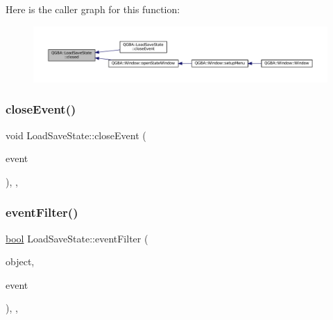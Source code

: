 Here is the caller graph for this function\+:
\nopagebreak
\begin{figure}[H]
\begin{center}
\leavevmode
\includegraphics[width=350pt]{class_q_g_b_a_1_1_load_save_state_a2f8bf8d005d4c4b37e1f510b069016b9_icgraph}
\end{center}
\end{figure}
\mbox{\label{class_q_g_b_a_1_1_load_save_state_a93708b5072f80412acfa87f61e06518c}} 
\subsubsection{\texorpdfstring{close\+Event()}{closeEvent()}}
{\footnotesize\ttfamily void Load\+Save\+State\+::close\+Event (\begin{DoxyParamCaption}\item[{Q\+Close\+Event $\ast$}]{event }\end{DoxyParamCaption})\hspace{0.3cm}{\ttfamily [override]}, {\ttfamily [protected]}, {\ttfamily [virtual]}}

\mbox{\label{class_q_g_b_a_1_1_load_save_state_ad80e912f91cfa7693004fb0d2d5ea409}} 
\subsubsection{\texorpdfstring{event\+Filter()}{eventFilter()}}
{\footnotesize\ttfamily \mbox{\hyperlink{libretro_8h_a4a26dcae73fb7e1528214a068aca317e}{bool}} Load\+Save\+State\+::event\+Filter (\begin{DoxyParamCaption}\item[{Q\+Object $\ast$}]{object,  }\item[{Q\+Event $\ast$}]{event }\end{DoxyParamCaption})\hspace{0.3cm}{\ttfamily [override]}, {\ttfamily [protected]}, {\ttfamily [virtual]}}

